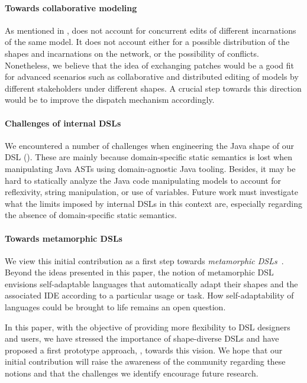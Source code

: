 \paragraph{Towards collaborative modeling}
As mentioned in , \prism does not account for concurrent edits of different incarnations of the same model.
It does not account either for a possible distribution of the shapes and incarnations on the network, or the possibility of conflicts.
Nonetheless, we believe that the idea of exchanging patches would be a good fit for advanced scenarios such as collaborative and distributed editing of models by different stakeholders under different shapes.
A crucial step towards this direction would be to improve the dispatch mechanism accordingly.

\paragraph{Challenges of internal DSLs}
We encountered a number of challenges when engineering the Java shape of our DSL ().
These are mainly because domain-specific static semantics is lost when manipulating Java ASTs using domain-agnostic Java tooling.
Besides, it may be hard to statically analyze the Java code manipulating models to account for reflexivity, string manipulation, or use of variables.
Future work must investigate what the limits imposed by internal DSLs in this context are, especially regarding the absence of domain-specific static semantics.

\paragraph{Towards metamorphic DSLs}
We view this initial contribution as a first step towards \emph{metamorphic DSLs}~\cite{acher2014metamorphic}.
Beyond the ideas presented in this paper, the notion of metamorphic DSL envisions self-adaptable languages that automatically adapt their shapes and the associated IDE according to a particular usage or task.
How self-adaptability of languages could be brought to life remains an open question.

In this paper, with the objective of providing more flexibility to DSL designers and users, we have stressed the importance of shape-diverse DSLs and have proposed a first prototype approach, \prism, towards this vision.
We hope that our initial contribution will raise the awareness of the community regarding these notions and that the challenges we identify encourage future research.
